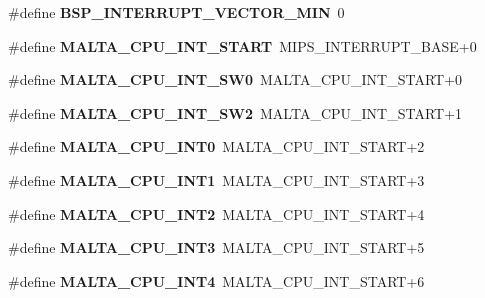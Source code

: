 \begin{DoxyCompactItemize}
\#define {\bfseries B\+S\+P\+\_\+\+I\+N\+T\+E\+R\+R\+U\+P\+T\+\_\+\+V\+E\+C\+T\+O\+R\+\_\+\+M\+IN}~0
\item 
\mbox{\label{group__bsp__interrupt_ga0759c07351dd874c2e71948986ef34d6}} 
\#define {\bfseries M\+A\+L\+T\+A\+\_\+\+C\+P\+U\+\_\+\+I\+N\+T\+\_\+\+S\+T\+A\+RT}~M\+I\+P\+S\+\_\+\+I\+N\+T\+E\+R\+R\+U\+P\+T\+\_\+\+B\+A\+SE+0
\item 
\mbox{\label{group__bsp__interrupt_ga95835e9b586eac05fd2237d0eedae6fa}} 
\#define {\bfseries M\+A\+L\+T\+A\+\_\+\+C\+P\+U\+\_\+\+I\+N\+T\+\_\+\+S\+W0}~M\+A\+L\+T\+A\+\_\+\+C\+P\+U\+\_\+\+I\+N\+T\+\_\+\+S\+T\+A\+RT+0
\item 
\mbox{\label{group__bsp__interrupt_gab1a6a2a9cbc77b2c87358e01d3c5325a}} 
\#define {\bfseries M\+A\+L\+T\+A\+\_\+\+C\+P\+U\+\_\+\+I\+N\+T\+\_\+\+S\+W2}~M\+A\+L\+T\+A\+\_\+\+C\+P\+U\+\_\+\+I\+N\+T\+\_\+\+S\+T\+A\+RT+1
\item 
\mbox{\label{group__bsp__interrupt_ga6f323bd4038cf1fd203b68c4179a8ee5}} 
\#define {\bfseries M\+A\+L\+T\+A\+\_\+\+C\+P\+U\+\_\+\+I\+N\+T0}~M\+A\+L\+T\+A\+\_\+\+C\+P\+U\+\_\+\+I\+N\+T\+\_\+\+S\+T\+A\+RT+2
\item 
\mbox{\label{group__bsp__interrupt_gaa2c6496098e8fe0b3ddcb909869165a4}} 
\#define {\bfseries M\+A\+L\+T\+A\+\_\+\+C\+P\+U\+\_\+\+I\+N\+T1}~M\+A\+L\+T\+A\+\_\+\+C\+P\+U\+\_\+\+I\+N\+T\+\_\+\+S\+T\+A\+RT+3
\item 
\mbox{\label{group__bsp__interrupt_ga1d018f3bcfa008710eb0fe463635ee89}} 
\#define {\bfseries M\+A\+L\+T\+A\+\_\+\+C\+P\+U\+\_\+\+I\+N\+T2}~M\+A\+L\+T\+A\+\_\+\+C\+P\+U\+\_\+\+I\+N\+T\+\_\+\+S\+T\+A\+RT+4
\item 
\mbox{\label{group__bsp__interrupt_ga4d41eafddc355dfc8911d3a9ba858aed}} 
\#define {\bfseries M\+A\+L\+T\+A\+\_\+\+C\+P\+U\+\_\+\+I\+N\+T3}~M\+A\+L\+T\+A\+\_\+\+C\+P\+U\+\_\+\+I\+N\+T\+\_\+\+S\+T\+A\+RT+5
\item 
\mbox{\label{group__bsp__interrupt_ga725d0ee37be369237724f10761305dcc}} 
\#define {\bfseries M\+A\+L\+T\+A\+\_\+\+C\+P\+U\+\_\+\+I\+N\+T4}~M\+A\+L\+T\+A\+\_\+\+C\+P\+U\+\_\+\+I\+N\+T\+\_\+\+S\+T\+A\+RT+6

\end{DoxyCompactItemize}
